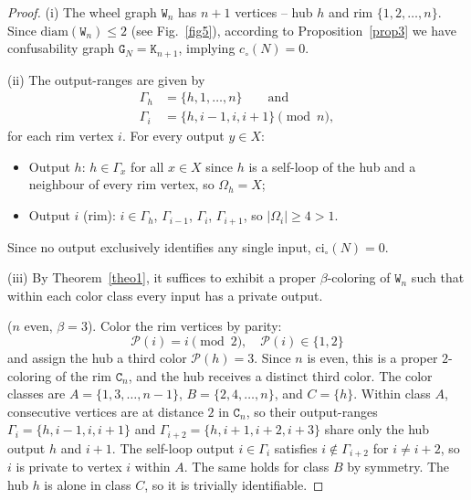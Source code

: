 \documentclass[12pt,a4paper]{article}
\begin{document}
\begin{proof}
(i) The wheel graph $\mathtt{W}_n$ has $n+1$ vertices -- hub $h$ and rim $\{1, 2, \ldots, n\}$. Since $\mathrm{diam}(\mathtt{W}_n)\le2$ (see Fig.~\ref{fig5}), according to Proposition~\ref{prop3} we have confusability graph $\mathtt{G}_N=\mathtt{K}_{n+1}$, implying $c_\circ(N)=0$.
 
\noindent (ii) The output-ranges are given by
\begin{align*}
\Gamma_h&= \{h, 1, \ldots, n\}\qquad \text{and}\\
\Gamma_i&= \{h, i-1, i, i+1\} \pmod{n},   
\end{align*}
for each rim vertex $i$. For every output $y \in X$:
\begin{itemize}[itemsep=-0.15cm, parsep=0.15cm, topsep=2pt, leftmargin=0.4cm]
\item Output $h$: $h \in \Gamma_x$ for all $x \in X$ since $h$ is a self-loop of the hub and a neighbour of every rim vertex, so $\Omega_h = X$;
\item Output $i$ (rim): $i \in \Gamma_h$, $\Gamma_{i-1}$, $\Gamma_i$, $\Gamma_{i+1}$, so $|\Omega_i| \geq 4 > 1$.
\end{itemize}
Since no output exclusively identifies any single input, $\mathrm{ci}_\circ(N) = 0$.

\noindent (iii) By Theorem~\ref{theo1}, it suffices to exhibit a proper $\beta$-coloring of $\mathtt{W}_n$ such that within each 
color class every input has a private output.

 ($n$ even, $\beta = 3$). Color the rim vertices by parity:
\begin{equation*}
\mathcal{P}(i) = i\pmod{2},\quad \mathcal{P}(i) \in \{1, 2\}
\end{equation*}
and assign the hub a third color $\mathcal{P}(h) = 3$. Since $n$ is even, this is a proper $2$-coloring of the rim $\mathtt{C}_n$, and the hub receives a distinct third color. The color classes are $A = \{1, 3, \ldots, n-1\}$, $B = \{2, 4, \ldots, n\}$, and $C = \{h\}$. Within class $A$, consecutive vertices are at distance $2$ in $\mathtt{C}_n$, so their output-ranges $\Gamma_i = \{h, i-1, i, i+1\}$ and $\Gamma_{i+2} = \{h, i+1, i+2, i+3\}$ share only the hub output $h$ and $i+1$. The self-loop output $i \in \Gamma_i$ satisfies $i \notin \Gamma_{i+2}$ for $i \neq i+2$, so $i$ is private to vertex $i$ within $A$. The same holds for class $B$ by symmetry. The hub $h$ is alone in class $C$, so it is trivially 
identifiable.


\end{proof}
\end{document}
